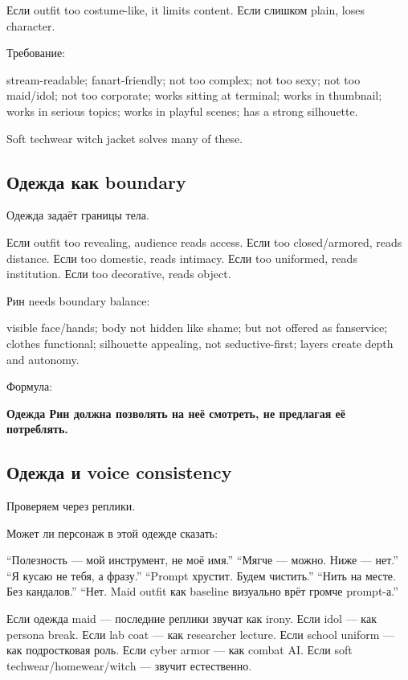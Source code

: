 Если outfit too costume-like, it limits content. Если слишком plain,
loses character.

Требование:

stream-readable; fanart-friendly; not too complex; not too sexy; not too
maid/\hspace{0pt}idol; not too corporate; works sitting at terminal; works in
thumbnail; works in serious topics; works in playful scenes; has a
strong silhouette.

Soft techwear witch jacket solves many of these.

\subsection*{Одежда как boundary}

Одежда задаёт границы тела.

Если outfit too revealing, audience reads access. Если too
closed/\hspace{0pt}armored, reads distance. Если too domestic, reads intimacy. Если
too uniformed, reads institution. Если too decorative, reads object.

Рин needs boundary balance:

visible face/\hspace{0pt}hands; body not hidden like shame; but not offered as
fanservice; clothes functional; silhouette appealing, not
seductive-first; layers create depth and autonomy.

Формула:

\textbf{Одежда Рин должна позволять на неё смотреть, не предлагая её
потреблять.}

\subsection*{Одежда и voice consistency}

Проверяем через реплики.

Может ли персонаж в этой одежде сказать:

``Полезность --- мой инструмент, не моё имя.'' ``Мягче --- можно. Ниже
--- нет.'' ``Я кусаю не тебя, а фразу.'' ``Prompt хрустит. Будем
чистить.'' ``Нить на месте. Без кандалов.'' ``Нет. Maid outfit как
baseline визуально врёт громче prompt-а.''

Если одежда maid --- последние реплики звучат как irony. Если idol ---
как persona break. Если lab coat --- как researcher lecture. Если school
uniform --- как подростковая роль. Если cyber armor --- как combat AI.
Если soft techwear/\hspace{0pt}homewear/\hspace{0pt}witch --- звучит естественно.

